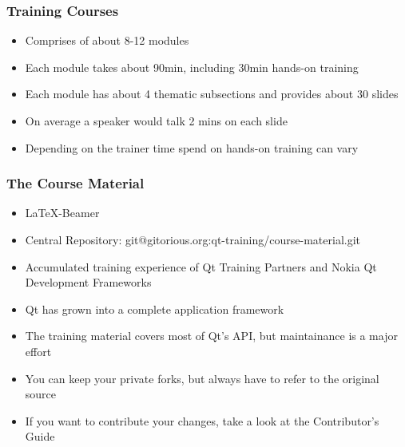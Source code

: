 \begin{slide}
  \frametitle{Training Courses}
  \begin{itemize}
    \item Comprises of about 8-12 modules
    \item Each module takes about 90min, including 30min hands-on training
    \item Each module has about 4 thematic subsections and provides about 30 slides
    \item On average a speaker would talk 2 mins on each slide
    \item Depending on the trainer time spend on hands-on training can vary
  \end{itemize}
\end{slide}

\begin{slide}
  \frametitle{The Course Material}
  \begin{itemize}
    \item \LaTeX-Beamer
    \item Central Repository: git@gitorious.org:qt-training/course-material.git
    \item Accumulated training experience of Qt Training Partners and Nokia Qt Development Frameworks
    \item Qt has grown into a complete application framework
    \item The training material covers most of Qt's API, but maintainance is a major effort
    \item You can keep your private forks, but always have to refer to the original source
    \item If you want to contribute your changes, take a look at the Contributor's Guide
  \end{itemize}
\end{slide}
